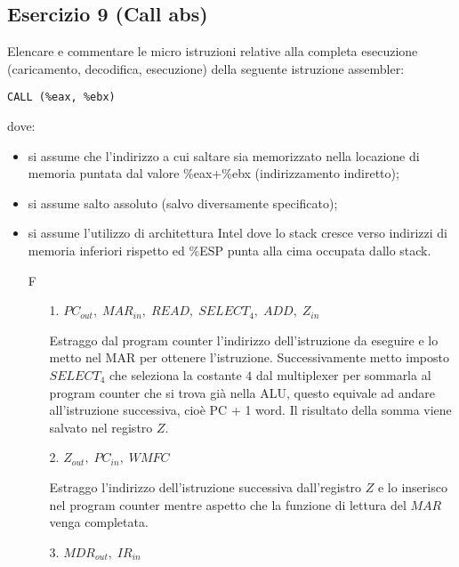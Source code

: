 \documentclass[a4paper]{article}
\theoremstyle{break}
\theoremstyle{break}
\theoremstyle{break}
\theoremstyle{break}
\begin{document}
\subsection{Esercizio 9 (Call abs)}
\begin{exercise}
  Elencare e commentare le micro istruzioni relative alla completa esecuzione
  (caricamento, decodifica, esecuzione) della seguente istruzione assembler: 
  \begin{center}
    \texttt{CALL (\%eax, \%ebx)}
  \end{center}
  dove:
  \begin{itemize}
    \item 
      si assume che l'indirizzo a cui saltare sia memorizzato nella locazione di memoria
      puntata dal valore \%eax+\%ebx (indirizzamento indiretto);
    \item 
      si assume salto assoluto (salvo diversamente specificato);
    \item 
      si assume l'utilizzo di architettura Intel dove lo stack cresce verso indirizzi
      di memoria inferiori rispetto ed \%ESP punta alla cima occupata dallo stack.
  \end{itemize}
  
  \begin{enumerate}
    \item [F]
      \begin{enumerate}
        \item[1.] \( PC_{out},\; MAR_{in},\; READ,\; SELECT_4,\; ADD,\; Z_{in} \) 

          \noindent Estraggo dal program counter l'indirizzo dell'istruzione da eseguire e
          lo metto nel MAR per ottenere l'istruzione. Successivamente metto imposto
          \( SELECT_4 \) che seleziona la costante \( 4 \) dal multiplexer per sommarla
          al program counter che si trova già nella ALU, questo equivale ad andare 
          all'istruzione successiva, cioè PC + 1 word. Il risultato della somma
          viene salvato nel registro \( Z \).

        \item[2.] \( Z_{out},\; PC_{in},\; WMFC \) 

          \noindent Estraggo l'indirizzo dell'istruzione successiva dall'registro \( Z \) 
          e lo inserisco nel program counter mentre aspetto che la funzione di lettura
          del \( MAR \) venga completata.

        \item[3.] \( MDR_{out},\; IR_{in} \) 


\end{enumerate}
\end{enumerate}
\end{exercise}
\end{document}
